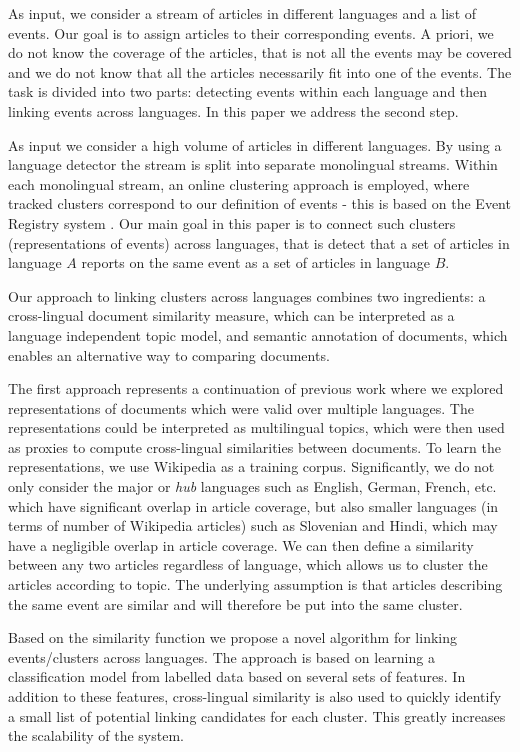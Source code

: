 \documentclass[twoside,11pt]{article}
\begin{document}
As input, we consider a stream of articles in different languages and a list of events. Our goal is to assign articles to their corresponding events. A priori, we do not know the coverage of the articles, that is not all the events may be covered and we do not know that all the articles necessarily fit into one of the events. The task is divided into two parts: detecting events within each language and then linking events across languages. In this paper we address the second step.

As input we consider a high volume of articles in different languages. By using a language detector the stream is split into separate monolingual streams. Within each monolingual stream, an online clustering approach is employed, where tracked clusters correspond to our definition of events - this is based on the Event Registry system . Our main goal in this paper is to connect such clusters (representations of events) across languages, that is detect that a set of articles in language $A$ reports on the same event as a set of articles in language $B$.

Our approach to linking clusters across languages combines two ingredients: a cross-lingual document similarity measure, which can be interpreted as a language independent topic model, and semantic annotation of documents, which enables an alternative way to comparing documents.

The first approach represents a continuation of previous work  where we explored representations of documents which were valid over multiple languages.  The representations could be interpreted as multilingual topics, which were then used as proxies to compute cross-lingual similarities between documents. To learn the representations, we use Wikipedia as a training corpus. Significantly, we do not only consider the major or \emph{hub} languages such as English, German, French, etc. which have significant overlap in article coverage, but also smaller languages (in terms of number of Wikipedia articles) such as Slovenian and Hindi, which may have a negligible overlap in article coverage. We can then define a similarity between any two articles regardless of language,  which allows us to cluster the articles according to topic. The underlying assumption is that articles describing the same event are similar  and will therefore be put into the same cluster.

Based on the similarity function we propose a novel algorithm for linking events/clusters across languages. The approach is based on learning a classification model from labelled data based on several sets of features. In addition to these features, cross-lingual similarity is also used to quickly identify a small list of potential linking candidates for each cluster.
This greatly increases the scalability of the system.
\end{document}
